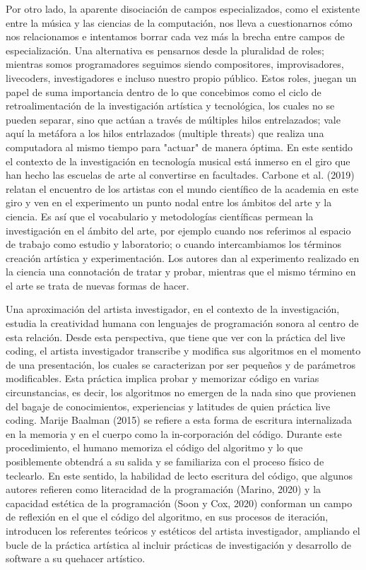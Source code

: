 Por otro lado, la aparente disociación de campos especializados, como el existente entre la música y las ciencias de la computación, nos lleva a cuestionarnos cómo nos relacionamos e intentamos borrar cada vez más la brecha entre campos de especialización. Una alternativa es pensarnos desde la pluralidad de roles; mientras somos programadores seguimos siendo compositores, improvisadores, livecoders, investigadores e incluso nuestro propio público. Estos roles, juegan un papel de suma importancia dentro de lo que concebimos como el ciclo de retroalimentación de la investigación artística y tecnológica, los cuales no se pueden separar, sino que actúan a través de múltiples hilos entrelazados; vale aquí la metáfora a los hilos entrlazados (multiple threats) que realiza una computadora al mismo tiempo para "actuar" de manera óptima. En este sentido el contexto de la investigación en tecnología musical está inmerso en el giro que han hecho las escuelas de arte al convertirse en facultades. Carbone et al. (2019) relatan el encuentro de los artistas con el mundo científico de la academia en este giro y ven en el experimento un punto nodal entre los ámbitos del arte y la ciencia. Es así que el vocabulario y metodologías científicas permean la investigación en el ámbito del arte, por ejemplo cuando nos referimos al espacio de trabajo como estudio y laboratorio; o cuando intercambiamos los términos creación artística y experimentación. Los autores dan al experimento realizado en la ciencia una connotación de tratar y probar, mientras que el mismo término en el arte se trata de nuevas formas de hacer.

Una aproximación del artista investigador, en el contexto de la investigación, estudia la creatividad humana con lenguajes de programación sonora al centro de esta relación. Desde esta perspectiva, que tiene que ver con la práctica del live coding, el artista investigador transcribe y modifica sus algoritmos en el momento de una presentación, los cuales se caracterizan por ser pequeños y de parámetros modificables. Esta práctica implica probar y memorizar código en varias circunstancias, es decir, los algoritmos no emergen de la nada sino que provienen del bagaje de conocimientos, experiencias y latitudes de quien práctica live coding. Marije Baalman (2015) se refiere a esta forma de escritura internalizada en la memoria y en el cuerpo como la in-corporación del código. Durante este procedimiento, el humano memoriza el código del algoritmo y lo que posiblemente obtendrá a su salida y se familiariza con el proceso físico de teclearlo. En este sentido, la habilidad de lecto escritura del código, que algunos autores refieren como literacidad de la programación (Marino, 2020) y la capacidad estética de la programación (Soon y Cox, 2020) conforman un campo de reflexión en el que el código del algoritmo, en sus procesos de iteración, introducen los referentes teóricos y estéticos del artista investigador, ampliando el bucle de la práctica artística al incluir prácticas de investigación y desarrollo de software a su quehacer artístico.


